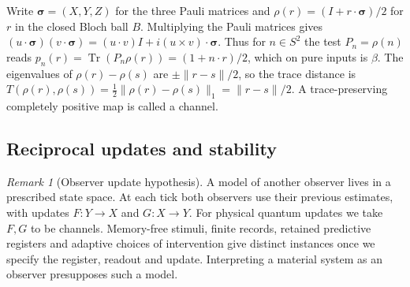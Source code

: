 \documentclass[aps,pra,onecolumn,superscriptaddress,nofootinbib,10pt]{revtex4-2}
\theoremstyle{definition}
\theoremstyle{remark}
\newtheorem{remark}[theorem]{Remark}
\newcommand{\tr}{\operatorname{Tr}}
\begin{document}
Write $\boldsymbol{\sigma}=(X,Y,Z)$ for the three Pauli matrices and
$\rho(r)=(I+r\cdot\boldsymbol{\sigma})/2$ for $r$ in the closed Bloch
ball $B$. Multiplying the Pauli matrices gives
$(u\cdot\boldsymbol{\sigma})(v\cdot\boldsymbol{\sigma})
=(u\cdot v)I+i(u\times v)\cdot\boldsymbol{\sigma}$.
Thus for $n\in S^2$ the test $P_n=\rho(n)$ reads
$p_n(r)=\tr(P_n\rho(r))=(1+n\cdot r)/2$, which on pure inputs is $\beta$.
The eigenvalues of $\rho(r)-\rho(s)$ are $\pm\|r-s\|/2$, so the trace
distance is $T(\rho(r),\rho(s))=\tfrac12\|\rho(r)-\rho(s)\|_1=\|r-s\|/2$.
A trace-preserving completely positive map is called a channel.

\subsection{Reciprocal updates and stability}\label{ob:dynamics}

\begin{remark}[Observer update hypothesis]\label{ob:observermodel}
A model of another observer lives in a prescribed state space.
At each tick both observers use their previous estimates, with updates
$F\colon Y\to X$ and $G\colon X\to Y$. For physical quantum updates
we take $F,G$ to be channels. Memory-free stimuli, finite records,
retained predictive registers and adaptive choices of intervention
give distinct instances once we specify the register, readout and update.
Interpreting a material system as an observer presupposes such a model.
\end{remark}
\end{document}
